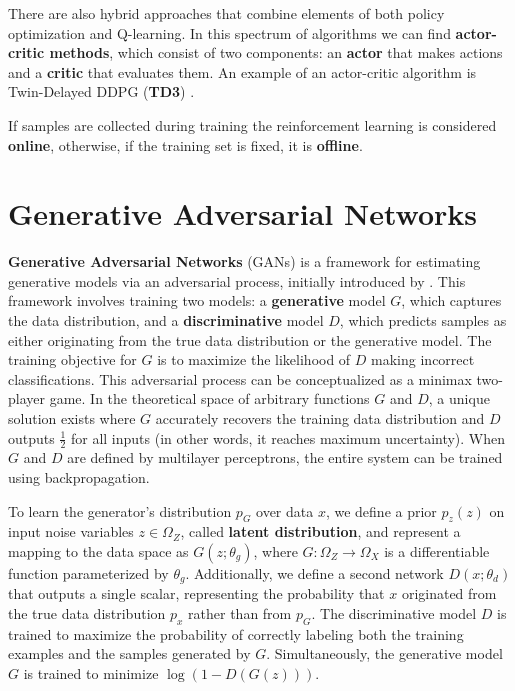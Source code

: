There are also hybrid approaches that combine elements
of both policy optimization and Q-learning.
In this spectrum of algorithms we can find 
\textbf{actor-critic methods}, which consist of two components:
an \textbf{actor} that makes actions and a \textbf{critic} that evaluates them.
An example of an actor-critic algorithm is Twin-Delayed DDPG (\textbf{TD3})
\cite{td3}.

If samples are collected during training the reinforcement learning is
considered \textbf{online}, otherwise,
if the training set is fixed, it is \textbf{offline}.

\section{Generative Adversarial Networks}
\label{sec:gan}

\textbf{Generative Adversarial Networks} (GANs) is a framework
for estimating generative models via an adversarial process,
initially introduced by \cite{goodfellow2014}.
This framework involves training two models:
a \textbf{generative} model \( G \), which captures the data
distribution, and a \textbf{discriminative} model \( D \),
which predicts samples as either originating from the true
data distribution or the generative model.
The training objective for \( G \) is to maximize
the likelihood of \( D \) making incorrect classifications.
This adversarial process can be conceptualized as a minimax two-player game.
In the theoretical space of arbitrary functions \( G \) and \( D \),
a unique solution exists where \( G \) accurately
recovers the training data distribution and \( D \) outputs $\frac{1}{2}$
for all inputs (in other words, it reaches maximum uncertainty).
When \( G \) and \( D \) are defined by multilayer perceptrons,
the entire system can be trained using backpropagation.

To learn the generator's distribution \( p_G \)
over data \( x \), we define a prior \( p_z(z) \) on input noise variables
$z \in \Omega_Z$, called \textbf{latent distribution},
and represent a mapping to the data space as
\( G(z; \theta_g) \), where \( G: \Omega_Z \rightarrow \Omega_X \)
is a differentiable function parameterized by \( \theta_g \).
Additionally, we define a second network
\( D(x; \theta_d) \) that outputs a single scalar,
representing the probability that \( x \) originated
from the true data distribution $p_x$ rather than from \( p_G \).
The discriminative model \( D \) is trained to maximize
the probability of correctly labeling both the training
examples and the samples generated by \( G \).
Simultaneously, the generative model \( G \) is trained to minimize
\( \log(1 - D(G(z))) \).

